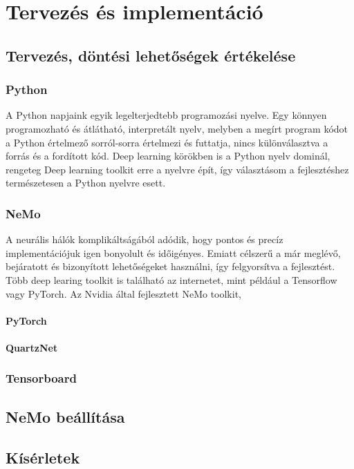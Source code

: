 \chapter{Tervezés és implementáció}

\section{Tervezés, döntési lehetőségek értékelése}

\subsection{Python}

A Python napjaink egyik legelterjedtebb programozási nyelve. Egy könnyen programozható és átlátható, interpretált nyelv, melyben a megírt program kódot a Python értelmező sorról-sorra értelmezi és futtatja, nincs különválasztva a forrás és a fordított kód. Deep learning körökben is a Python nyelv dominál, rengeteg Deep learning toolkit erre a nyelvre épít, így választásom a fejlesztéshez természetesen a Python nyelvre esett.

\subsection{NeMo}

A neurális hálók komplikáltságából adódik, hogy pontos és precíz implementációjuk igen bonyolult és időigényes. Emiatt célszerű a már meglévő, bejáratott és bizonyított lehetőségeket használni, így felgyorsítva a fejlesztést. Több deep learing toolkit is található az internetet, mint például a Tensorflow vagy PyTorch. Az Nvidia által fejlesztett NeMo toolkit,

\subsubsection{PyTorch}

\subsubsection{QuartzNet}

\subsection{Tensorboard}

\section{NeMo beállítása}

\section{Kísérletek}